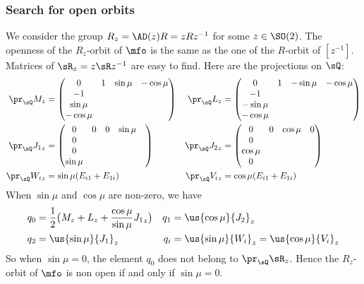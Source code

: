 \subsubsection{Search for open orbits}

We consider the group $R_z=\AD(z)R=zRz^{-1}$ for some $z\in \SO(2)$. The openness of the $R_z$-orbit of $\mfo$ is the same as the one of the $R$-orbit of $[z^{-1}]$. Matrices of $\sR_z=z\sR z^{-1}$ are easy to find. Here are the projections on $\sQ$:
\begin{subequations}
\begin{align}
\pr_{\sQ} M_z&=
\begin{pmatrix}
0&1&\sin\mu&-\cos\mu\\
-1\\
\sin\mu\\
-\cos\mu
\end{pmatrix}
&\pr_{\sQ} L_z&=
\begin{pmatrix}
0&1&-\sin\mu&-\cos\mu\\
-1\\-\sin\mu\\
-\cos\mu
\end{pmatrix}\\
 \pr_{\sQ} {J_1}_z&=
\begin{pmatrix}
0&0&0&\sin\mu&\\
0\\
0\\
\sin\mu
\end{pmatrix}
&\pr_{\sQ} {J_2}_z&=
\begin{pmatrix}
0&0&\cos\mu&0\\
0\\
\cos\mu\\
0
\end{pmatrix}\\
 \pr_{\sQ} {W_i}_z&=\sin\mu(E_{i1}+E_{1i})&\pr_{\sQ} {V_i}_z&=\cos\mu(E_{i1}+E_{1i})
\end{align}
\end{subequations}
When $\sin\mu$ and $\cos\mu$ are non-zero, we have
\begin{subequations}
\begin{align}
q_0&=\frac{1}{2}\big(M_z+L_z+\frac{\cos\mu}{\sin\mu}{J_1}_z\big)&q_1&=\us{\cos\mu}{J_2}_z\\
q_2&=\us{\sin\mu}{J_1}_z&q_i&=\us{\sin\mu}{W_i}_z=\us{\cos\mu}{V_i}_z
\end{align}
\end{subequations}
 So when $\sin\mu=0$, the element $q_{0}$ does not belong to $\pr_{\sQ}\sR_{z}$. Hence the $R_z$-orbit of $\mfo$ is non open if and only if $\sin \mu=0$.

